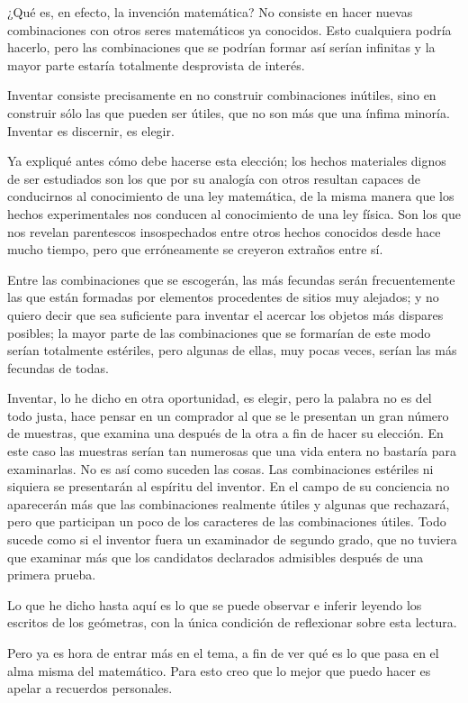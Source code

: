 \documentclass[a4paper, 12pt, draft]{article}
\begin{document}
¿Qué es, en efecto, la invención matemática? No consiste en
hacer nuevas combinaciones con otros seres matemáticos ya conocidos.
Esto cualquiera podría hacerlo, pero las combinaciones que se podrían formar así serían infinitas y la mayor parte estaría
totalmente desprovista de interés.

Inventar consiste precisamente en no construir combinaciones inútiles,
sino en construir sólo las que pueden ser útiles, que no son más
que una ínfima minoría. Inventar es discernir, es elegir.

Ya expliqué antes cómo debe hacerse esta elección; los hechos
materiales dignos de ser estudiados son los que por su analogía con
otros resultan capaces de conducirnos al conocimiento de una ley matemática, de la misma manera que los hechos experimentales nos conducen al
conocimiento de una ley física. Son los que nos revelan parentescos
insospechados
entre otros hechos conocidos desde hace mucho tiempo, pero que erróneamente se creyeron extraños entre sí.

Entre las combinaciones que se escogerán, las más fecundas serán
frecuentemente las que están formadas por elementos procedentes de
sitios muy alejados; y no quiero decir que sea suficiente para inventar el
acercar los objetos más dispares posibles; la mayor parte de las
combinaciones que se formarían de este modo serían totalmente estériles, pero algunas de ellas, muy pocas veces, serían las más
fecundas de todas.

Inventar, lo he dicho en otra oportunidad, es elegir, pero la palabra no es
del todo justa, hace pensar en un comprador al que se le presentan un gran número de muestras, que examina una después de la otra a fin de hacer
su elección. En este caso las muestras serían tan numerosas que una
vida entera no bastaría para examinarlas. No es así como suceden
las cosas. Las combinaciones estériles ni siquiera se presentarán al
espíritu del inventor. En el campo de su conciencia no aparecerán más que las combinaciones realmente útiles y algunas que rechazará, pero que participan un poco de los caracteres de las combinaciones útiles. Todo sucede como si el inventor fuera un examinador de segundo grado,
que no tuviera que examinar más que los candidatos declarados admisibles
después de una primera prueba.

Lo que he dicho hasta aquí es lo que se puede observar e inferir
leyendo los escritos de los geómetras, con la única condición de
reflexionar sobre esta lectura.

Pero ya es hora de entrar más en el tema, a fin de ver qué es lo que
pasa en el alma misma del matemático. Para esto creo que lo mejor que
puedo hacer es apelar a recuerdos personales.
\end{document}
